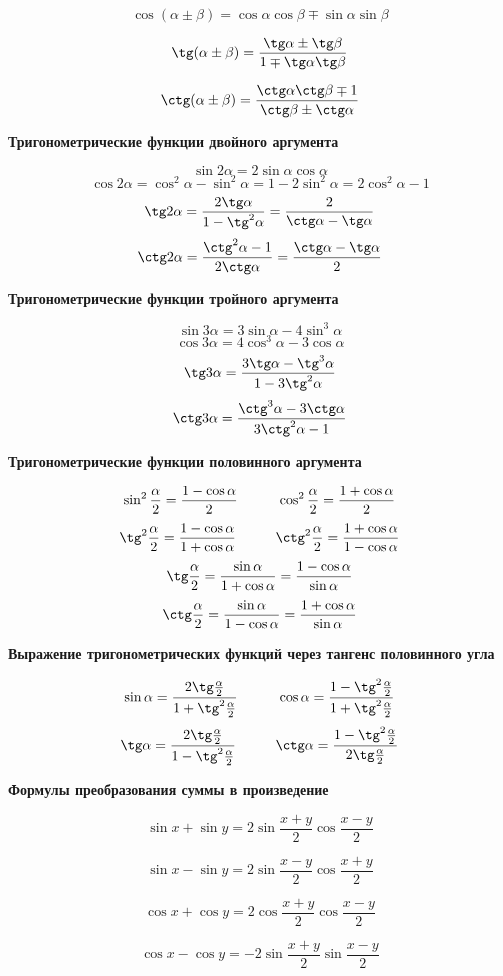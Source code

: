 \documentclass[a4paper, 14pt]{extarticle}
\begin{document}
{$$\cos(\alpha \pm \beta )=\cos \alpha \cos\beta \mp \sin\alpha\sin\beta$$

$$\tg(\alpha\pm\beta)=\frac{\tg\alpha\pm\tg\beta}{1\mp\tg\alpha\tg\beta}$$

$$\ctg(\alpha\pm\beta)=\frac{\ctg\alpha\ctg\beta\mp1}{\ctg\beta\pm\ctg\alpha}$$

\textbf{Тригонометрические функции двойного аргумента}

$$\sin2\alpha=2\sin\alpha\cos\alpha$$
$$\cos2\alpha=\cos^2\alpha-\sin^2\alpha=1-2\sin^2\alpha=2\cos^2\alpha-1$$
$$\tg2\alpha=\frac{2\tg\alpha}{1-\tg^2\alpha}=\frac{2}{\ctg\alpha-\tg\alpha}$$
$$\ctg 2\alpha=\frac{\ctg^2\alpha-1}{2\ctg\alpha}=\frac{\ctg\alpha-\tg\alpha}{2}$$

\textbf{Тригонометрические функции тройного аргумента}

$$\sin3\alpha=3\sin\alpha-4\sin^3\alpha$$
$$\cos3\alpha=4\cos^3\alpha - 3\cos\alpha$$
$$\tg3\alpha=\frac{3\tg\alpha-\tg^3\alpha}{1-3\tg^2\alpha}$$
$$\ctg3\alpha=\frac{\ctg^3\alpha-3\ctg\alpha}{3\ctg^2\alpha-1}$$

\textbf{Тригонометрические функции половинного аргумента}

$$\sin^2\frac{\alpha}{2}=\frac{1-\cos\alpha}{2}
\hskip 1cm
\cos^2\frac{\alpha}{2}=\frac{1+\cos\alpha}{2}$$
$$\tg^2\frac{\alpha}{2}=\frac{1-\cos\alpha}{1+\cos\alpha}
\hskip 1cm
\ctg^2\frac{\alpha}{2}=\frac{1+\cos\alpha}{1-\cos\alpha}$$
$$\tg\frac{\alpha}{2}=\frac{\sin\alpha}{1+\cos\alpha}=\frac{1-\cos\alpha}{\sin\alpha}$$
$$\ctg\frac{\alpha}{2}=\frac{\sin\alpha}{1-\cos\alpha}=\frac{1+\cos\alpha}{\sin\alpha}$$

\bigskip
\textbf{Выражение тригонометрических функций через тангенс половинного угла}

$$\sin\alpha=\frac{2\tg\frac{\alpha}{2}}{1+\tg^2\frac{\alpha}{2}}
\hskip 1cm
\cos\alpha=\frac{1-\tg^2\frac{\alpha}{2}}{1+\tg^2\frac{\alpha}{2}}$$
$$\tg\alpha=\frac{2\tg\frac{\alpha}{2}}{1-\tg^2\frac{\alpha}{2}}
\hskip 1cm
\ctg\alpha=\frac{1-\tg^2\frac{\alpha}{2}}{2\tg\frac{\alpha}{2}}$$

\textbf{Формулы преобразования суммы в произведение}

$$\sin x+\sin y = 2\sin \frac{x+y}{2}\cos\frac{x-y}{2}$$

$$\sin x-\sin y = 2\sin \frac{x-y}{2}\cos\frac{x+y}{2}$$

$$\cos x+\cos y = 2\cos\frac{x+y}{2}\cos\frac{x-y}{2}$$

$$\cos x-\cos y = -2\sin\frac{x+y}{2}\sin\frac{x-y}{2}$$

}
\end{document}
